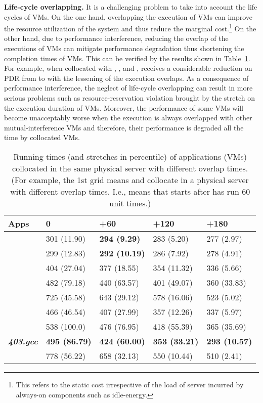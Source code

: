 \documentclass[10pt,journal]{IEEEtran}
\begin{document}
\textbf{Life-cycle overlapping.} 
It is a challenging problem to take into account the life cycles of VMs. On the one hand, overlapping the execution of VMs can improve the resource utilization of the system and thus reduce the marginal cost.\footnote{This refers to the static cost irrespective of the load of server incurred by always-on components such as idle-energy.} On the other hand, due to performance interference, reducing the overlap of the executions of VMs can mitigate performance degradation thus shortening the completion times of VMs. This can be verified by the results shown in Table~\ref{tb:temporal}. For example, when collocated with , , and ,  receives a considerable reduction on PDR from  to  with the lessening of the execution overlaps. As a consequence of performance interference, the neglect of life-cycle overlapping can result in more serious problems such as resource-reservation violation brought by the stretch on the execution duration of VMs. Moreover, the performance of some VMs will become unacceptably worse when the execution is always overlapped with other mutual-interference VMs and therefore, their performance is degraded all the time by collocated VMs.

\begin{table}[!t]
\centering
\caption{\label{tb:temporal}Running times (and stretches in percentile) of applications (VMs) collocated in the same physical server with different overlap times. (For example, the 1st grid means  and  collocate in a physical server with different overlap times. I.e.,  means that  starts after  has run 60 unit times.)}
\begin{tabular}{p{1.0cm}p{1.32cm}p{1.32cm}p{1.32cm}p{1.32cm}}\hline\hline {\bf Apps}	&	0&	+60&		+120	&	+180\\\hline
&	301 (11.90)&	{\bf 	294 (9.29)}&	283 (5.20)&	277 (2.97)\\
&	299 (12.83)&	{\bf 	292 (10.19)}&286 (7.92)&	278 (4.91)\\\hline
&	404 (27.04)&		377 (18.55)&	354 (11.32)&	336 (5.66)\\
&	482 (79.18)&		440 (63.57)&	401 (49.07)&	360 (33.83)\\
& 725 (45.58)&		643 (29.12)&	578 (16.06)&	523 (5.02)\\\hline
&	466 (46.54)&		407 (27.99)&	357 (12.26)&	337 (5.97)\\
&	538 (100.0)&		476 (76.95)&	418 (55.39)&	365 (35.69)\\
\textbf{\textit{403.gcc}}&	{\bf 495 (86.79)}&		{\bf 424 (60.00)}&	{\bf 353 (33.21)}&	{\bf 293 (10.57)}\\
&	778 (56.22)&		658 (32.13)&	550 (10.44)&	510 (2.41)\\\hline\hline
\end{tabular}
\end{table}
\end{document}
